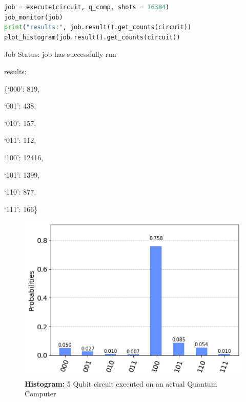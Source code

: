 \begin{lstlisting}[language=Python]
job = execute(circuit, q_comp, shots = 16384)
job_monitor(job)
print("results:", job.result().get_counts(circuit))
plot_histogram(job.result().get_counts(circuit))\end{lstlisting}

{\selectfont
\noindent Job Status: job has successfully run

\noindent results:\par
\{`000': 819,\par
`001': 438,\par
`010': 157,\par
`011': 112,\par
`100': 12416,\par
`101': 1399,\par
`110': 877,\par
`111': 166\}}

\begin{figure}[h]%
	\centering
	\includegraphics[width=0.9\linewidth]{./images/5qubit_act.png}
	\caption{\textbf{Histogram:} 5 Qubit circuit executed on an actual Quantum Computer}%
	\label{fig:5qubit_act}%
\end{figure}